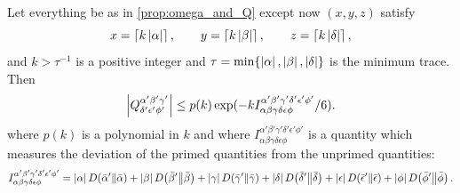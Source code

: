 \documentclass[notitlepage, 10pt]{article}
\begin{document}
\begin{lem}
    \label{lem:Q_upper_bound}
    Let everything be as in \cref{prop:omega_and_Q} except now $(x,y,z)$ satisfy
    \begin{equation}
        \label{eq:rounding_up}
        x = \left\lceil k \left|\alpha\right|\right\rceil,
        \qquad
        y = \left\lceil k \left|\beta\right|\right\rceil,
        \qquad
        z = \left\lceil k \left|\delta\right|\right\rceil,
    \end{equation}
    and $k > \tau^{-1}$ is a positive integer and $\tau = \min\{\left|\alpha\right|, \left|\beta\right|, \left|\delta\right|\}$ is the minimum trace.
    Then
    \begin{equation}
        \left|Q^{\alpha'\beta'\gamma'}_{\delta'\epsilon'\phi'}\right| 
        \leq p(k) \exp(-k I^{\alpha'\beta'\gamma'\delta'\epsilon'\phi'}_{\alpha\beta\gamma\delta\epsilon\phi}/6).
        \label{eq:Q_upper_bound}
    \end{equation}
    where $p(k)$ is a polynomial in $k$ and where $I^{\alpha'\beta'\gamma'\delta'\epsilon'\phi'}_{\alpha\beta\gamma\delta\epsilon\phi}$ is a quantity which measures the deviation of the primed quantities from the unprimed quantities:
    \begin{equation}
        I^{\alpha'\beta'\gamma'\delta'\epsilon'\phi'}_{\alpha\beta\gamma\delta\epsilon\phi}
        =\left|\alpha\right| D\!\left(\bar \alpha'\middle\|\bar \alpha\right)
        +\left|\beta\right| D\!\left(\bar \beta'\middle\|\bar \beta\right)
        +\left|\gamma\right| D\!\left(\bar \gamma'\middle\|\bar \gamma\right)
        +\left|\delta\right| D\!\left(\bar \delta'\middle\|\bar \delta\right)
        +\left|\epsilon\right| D\!\left(\bar \epsilon'\middle\|\bar \epsilon\right)
        +\left|\phi\right| D\!\left(\bar \phi'\middle\|\bar \phi\right).
    \end{equation}
\end{lem}
\end{document}
